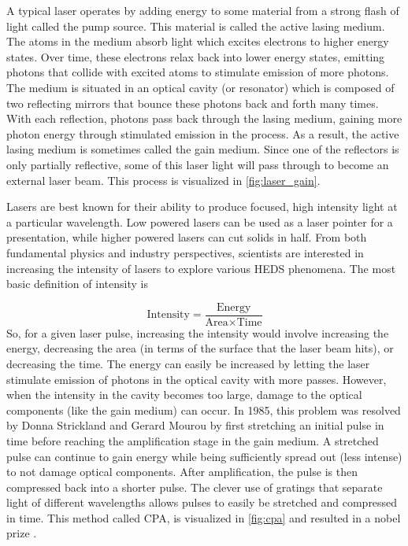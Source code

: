 A typical laser operates by adding energy to some material from a strong flash of light called the pump source. This material is called the active lasing medium. The atoms in the medium absorb light which excites electrons to higher energy states. Over time, these electrons relax back into lower energy states, emitting photons that collide with excited atoms to stimulate emission of more photons. The medium is situated in an optical cavity (or resonator) which is composed of two reflecting mirrors that bounce these photons back and forth many times. With each reflection, photons pass back through the lasing medium, gaining more photon energy through stimulated emission in the process. As a result, the active lasing medium is sometimes called the gain medium. Since one of the reflectors is only partially reflective, some of this laser light will pass through to become an external laser beam. This process is visualized in \autoref{fig:laser_gain}.

Lasers are best known for their ability to produce focused, high intensity light at a particular wavelength. Low powered lasers can be used as a laser pointer for a presentation, while higher powered lasers can cut solids in half. From both fundamental physics and industry perspectives, scientists are interested in increasing the intensity of lasers to explore various \gls{HEDS} phenomena. The most basic definition of intensity is

\begin{equation}
	\text{Intensity} = \frac{\text{Energy}}{\text{Area} \times \text{Time}}	
\end{equation}
So, for a given laser pulse, increasing the intensity would involve increasing the energy, decreasing the area (in terms of the surface that the laser beam hits), or decreasing the time. The energy can easily be increased by letting the laser stimulate emission of photons in the optical cavity with more passes. However, when the intensity in the cavity becomes too large, damage to the optical components (like the gain medium) can occur. In 1985, this problem was resolved by Donna Strickland and Gerard Mourou \cite{Strickland_1985_Optics} by first stretching an initial pulse in time before reaching the amplification stage in the gain medium. A stretched pulse can continue to gain energy while being sufficiently spread out (less intense) to not damage optical components. After amplification, the pulse is then compressed back into a shorter pulse. The clever use of gratings that separate light of different wavelengths allows pulses to easily be stretched and compressed in time. This method called \gls{CPA}, is visualized in \autoref{fig:cpa} and resulted in a nobel prize \cite{Nobel_2018}.

